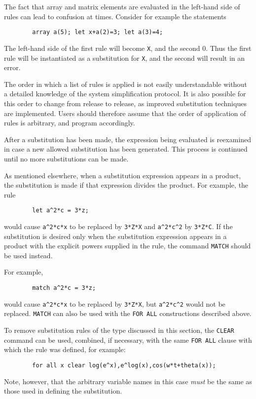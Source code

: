 The fact that array and matrix elements are evaluated in the left-hand side
of rules can lead to confusion at times. Consider for example the
statements
\begin{verbatim}
        array a(5); let x+a(2)=3; let a(3)=4;
\end{verbatim}
The left-hand side of the first rule will become \texttt{X}, and the second
0.  Thus the first rule will be instantiated as a substitution for
\texttt{X}, and the second will result in an error.

The order in which a list of rules is applied is not easily understandable
without a detailed knowledge of the system simplification protocol. It is
also possible for this order to change from release to release, as improved
substitution techniques are implemented. Users should therefore assume
that the order of application of rules is arbitrary, and program
accordingly.

After a substitution has been made, the expression being evaluated is
reexamined in case a new allowed substitution has been generated. This
process is continued until no more substitutions can be made.

\hypertarget{command:MATCH}{}
As mentioned elsewhere, when a substitution expression appears in a
product, the substitution is made if that expression divides the product.
For example, the rule
\begin{verbatim}
        let a^2*c = 3*z;
\end{verbatim}
would cause \texttt{a\textasciicircum 2*c*x} to be replaced by \texttt{3*Z*X} and
\texttt{a\textasciicircum 2*c\textasciicircum 2} by \texttt{3*Z*C}.  If the substitution is desired only
when the substitution expression appears in a product with the explicit
powers supplied in the rule, the command \texttt{MATCH} should be used
instead.

For example,
\begin{verbatim}
        match a^2*c = 3*z;
\end{verbatim}
would cause \texttt{a\textasciicircum 2*c*x} to be replaced by \texttt{3*Z*X}, but
\texttt{a\textasciicircum 2*c\textasciicircum 2} would not be replaced. \texttt{MATCH} can also be used
with the \texttt{FOR ALL} constructions described above.

To remove substitution rules of the type discussed in this section, the
\texttt{CLEAR} command can be used, combined, if necessary,
with the same \texttt{FOR ALL} clause with which the rule was defined, for
example:
\begin{verbatim}
        for all x clear log(e^x),e^log(x),cos(w*t+theta(x));
\end{verbatim}
Note, however, that the arbitrary variable names in this case \emph{must}
be the same as those used in defining the substitution.

